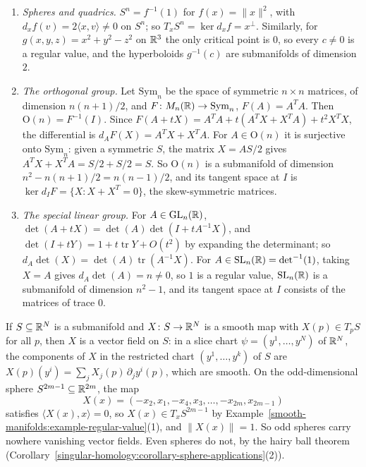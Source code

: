 \begin{example}\label{smooth-manifolds:example-regular-value}
\begin{enumerate}
\item \emph{Spheres and quadrics.} $S^n = f^{-1}(1)$ for $f(x) = \|x\|^2$, with $d_xf(v) = 2\langle x, v\rangle \neq 0$ on $S^n$; so
$T_xS^n = \ker d_xf = x^\perp$. Similarly, for $g(x, y, z) = x^2 + y^2 - z^2$ on $\mathbb{R}^3$ the only critical point is $0$, so every $c \neq 0$ is a regular value,
and the hyperboloids $g^{-1}(c)$ are submanifolds of dimension $2$.
\item \emph{The orthogonal group.} Let $\mathrm{Sym}_n$ be the space of symmetric $n \times n$ matrices, of dimension $n(n + 1)/2$, and $F \colon M_n(\mathbb{R}) \to
\mathrm{Sym}_n$, $F(A) = A^TA$. Then $\mathrm{O}(n) = F^{-1}(I)$. Since $F(A + tX) = A^TA + t(A^TX + X^TA) + t^2X^TX$, the differential is
$d_AF(X) = A^TX + X^TA$. For $A \in \mathrm{O}(n)$ it is surjective onto $\mathrm{Sym}_n$: given a symmetric $S$, the matrix $X = AS/2$ gives
$A^TX + X^TA = S/2 + S/2 = S$. So $\mathrm{O}(n)$ is a submanifold of dimension $n^2 - n(n + 1)/2 = n(n - 1)/2$, and its tangent space at $I$ is
$\ker d_IF = \{X : X + X^T = 0\}$, the skew-symmetric matrices.
\item \emph{The special linear group.} For $A \in \mathrm{GL}_n(\mathbb{R})$, $\det(A + tX) = \det(A)\det(I + tA^{-1}X)$, and $\det(I + tY) = 1 + t\operatorname{tr}Y + O(t^2)$
by expanding the determinant; so $d_A\det(X) = \det(A)\operatorname{tr}(A^{-1}X)$. For $A \in \mathrm{SL}_n(\mathbb{R}) = \det^{-1}(1)$, taking $X = A$ gives $d_A\det(A) = n
\neq 0$, so $1$ is a regular value, $\mathrm{SL}_n(\mathbb{R})$ is a submanifold of dimension $n^2 - 1$, and its tangent space at $I$ consists of the matrices of trace $0$.
\end{enumerate}
\end{example}

\begin{example}\label{smooth-manifolds:example-vector-field-odd-sphere}
If $S \subseteq \mathbb{R}^N$ is a submanifold and $X \colon S \to \mathbb{R}^N$ is a smooth map with $X(p) \in T_pS$ for all $p$, then $X$ is a vector field on $S$: in a
slice chart $\psi = (y^1, \ldots, y^N)$ of $\mathbb{R}^N$, the components of $X$ in the restricted chart $(y^1, \ldots, y^k)$ of $S$ are
$X(p)(y^i) = \sum_j X_j(p)\,\partial_j y^i(p)$, which are smooth. On the odd-dimensional sphere $S^{2m-1} \subseteq \mathbb{R}^{2m}$, the map
\[
X(x) = (-x_2, x_1, -x_4, x_3, \ldots, -x_{2m}, x_{2m-1})
\]
satisfies $\langle X(x), x\rangle = 0$, so $X(x) \in T_xS^{2m-1}$ by Example~\ref{smooth-manifolds:example-regular-value}(1), and $\|X(x)\| = 1$. So odd
spheres carry nowhere vanishing vector fields. Even spheres do not, by the hairy ball theorem
(Corollary~\ref{singular-homology:corollary-sphere-applications}(2)).
\end{example}

